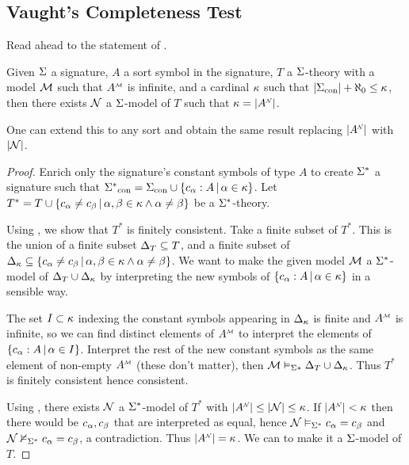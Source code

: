 \subsection{Vaught's Completeness Test}
Read ahead to the statement of .

\begin{prop}
    Given $\Sigma$ a signature, $A$ a sort symbol in the signature,
    $T$ a $\Sigma$-theory with a model $\mathcal{M}$ such that $\mmintp{A}$ is infinite,
    and a cardinal $\kappa$ such that $|{\Sigma}_\mathrm{con}| + \aleph_0 \leq \kappa$, 
    then there exists $\mathcal{N}$ a $\Sigma$-model of $T$ such that 
    $\ka = |\nnintp{A}|$.

    One can extend this to any sort and obtain the same result replacing 
    $\abs{\nnintp{A}}$ with $\left\vert \mathcal{N} \right\vert$.
\end{prop}
\begin{proof}
    Enrich only the signature's constant symbols of type $A$ to create $\Sigma^*$ 
    a signature such that 
    ${\Sigma^*}_\mathrm{con} = {\Sigma}_\mathrm{con} \cup \left\{c_\alpha : A \,|\, \alpha \in \kappa\right\}$.
    Let $T^* = T \cup \left\{
        c_\alpha \neq c_\beta \,|\, \alpha,\beta \in \kappa \land \alpha \ne \beta\right\}$
    be a $\Sigma^*$-theory.
    
    Using , 
    we show that $T^*$ is finitely consistent.
    Take a finite subset of $T^*$. 
    This is the union of a finite subset $\Delta_T \subseteq T$, 
    and a finite subset of 
    $\Delta_{\kappa} \subseteq 
    \left\{c_\alpha \neq c_\beta \,|\, \alpha,\beta \in \kappa \land \alpha \ne \beta\right\}$.
    We want to make the given model
    $\mathcal{M}$ a ${\Sigma^*}$-model of $\Delta_T \cup \Delta_\kappa$ 
    by interpreting the new symbols of $\left\{c_\alpha : A \,|\, \alpha \in \kappa\right\}$
    in a sensible way.
    
    The set $I \subset \kappa$ indexing the constant symbols 
    appearing in $\Delta_\kappa$ is finite and $\mmintp{A}$ is infinite, so
    we can find distinct elements of $\mmintp{A}$
    to interpret the elements of
    $\left\{c_\alpha : A \,|\, \alpha \in I\right\}$. 
    Interpret the rest of the new constant symbols as the same element of 
    non-empty $\mmintp{A}$ (these don't matter),
    then $\mathcal{M} \vDash_{\Sigma*} \Delta_T \cup \Delta_\kappa$.
    Thus $T^*$ is finitely consistent hence consistent.
    
    Using 
    ,
    there exists
    $\mathcal{N}$ a $\Sigma^*$-model of $T^*$ with $|\nnintp{A}| \leq |\NN| \leq \ka$.
    If $|\nnintp{A}| < \ka$ 
    then there would be $c_\alpha, c_\beta$ that are interpreted as equal,
    hence $\mathcal{N} \vDash_{\Sigma^*} c_\alpha = c_\beta$ and 
    $\mathcal{N} \nvDash_{\Sigma^*} c_\alpha = c_\beta$, 
    a contradiction.
    Thus $|\nnintp{A}| = \ka$.
    We can 
    to make it a $\Sigma$-model of $T$.
\end{proof}


